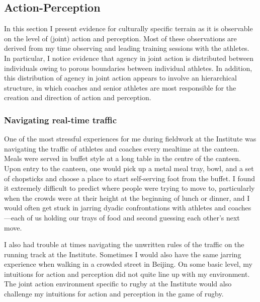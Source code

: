 \begin{CJK}{UTF8}{gbsn}
\subsection{Action-Perception}
In this section I present evidence for culturally specific terrain as it is observable on the level of (joint) action and perception.  Most of these observations are derived from my time observing and leading training sessions with the athletes.  In particular, I notice evidence that agency in joint action is distributed between individuals owing to porous boundaries between individual athletes. In addition, this distribution of agency in joint action appears to involve an hierarchical structure, in which coaches and senior athletes are most
responsible for the creation and direction of action and perception.

\subsubsection{Navigating real-time traffic}
One of the most stressful experiences for me during fieldwork at the Institute was navigating the traffic of athletes and coaches every mealtime at the canteen.  Meals were served in buffet style at a long table in the centre of the canteen. Upon entry to the canteen, one would pick up a metal meal tray, bowl, and a set of chopsticks and choose a place to start self-serving foot from the buffet.  I found it extremely difficult to predict where people were trying to move to, particularly when the crowds were at their height at the beginning of lunch or dinner, and I would often get stuck in jarring dyadic confrontations with athletes and coaches---each of us holding our trays of food and second guessing each other's next move.

I also had trouble at times navigating the unwritten rules of the traffic on the running track at the Institute.  Sometimes I would also have the same jarring experience when walking in a crowded street in Beijing. On some basic level, my intuitions for action and perception did not quite line up with my environment.  The joint action environment specific to rugby at the Institute would also challenge my intuitions for action and perception in the game of rugby.


\end{CJK}
